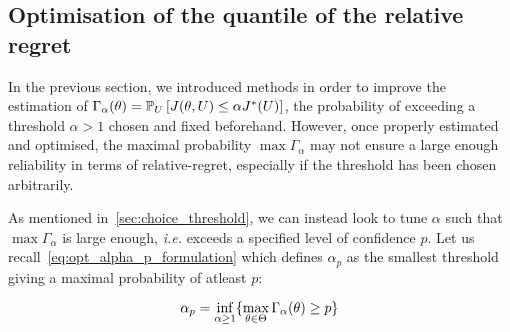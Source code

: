 \documentclass[../../Main_ManuscritThese.tex]{subfiles}
\begin{document}


\clearpage

\subsection{Optimisation of the quantile of the relative regret}
\label{sec:quantile_rr}
In the previous section, we introduced methods in order to improve the
estimation of
$\Gamma_{\alpha}(\theta)= \mathbb{P}_{U}\left[J(\theta, U) \leq \alpha
  J^*(U)\right]$, the probability of exceeding a threshold
$\alpha> 1$ chosen and fixed beforehand.
However, once properly estimated and optimised, the maximal
probability $\max \Gamma_{\alpha}$ may not ensure a large enough
reliability in terms of relative-regret, especially if the threshold
has been chosen arbitrarily.


As mentioned in~\cref{sec:choice_threshold}, we can instead look to tune
$\alpha$ such that $\max \Gamma_{\alpha}$ is large enough, \emph{i.e.}
exceeds a specified level of confidence
$p$. %
Let us recall~\cref{eq:opt_alpha_p_formulation} which defines
$\alpha_p$ as the smallest threshold giving a maximal probability of
atleast $p$:

\begin{equation}
  \label{eq:alpha_p_inf_formation}
  \alpha_p = \inf_{\alpha \geq 1}\{\max_{\theta \in \Theta}\Gamma_{\alpha}(\theta)\geq p \}
\end{equation}
\end{document}
